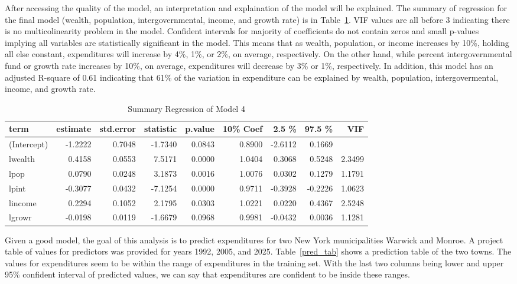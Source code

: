 \documentclass[11pt]{article}\usepackage[]{graphicx}\usepackage[]{color}
\begin{document}
\noindent After accessing the quality of the model, an interpretation and explaination of the model will be explained. The summary of regression for the final model (wealth, population, intergovernmental, income, and growth rate) is in Table~\ref{reg_summary_final}. VIF values are all before 3 indicating there is no multicolinearity problem in the model. Confident intervals for majority of coefficients do not contain zeros and small p-values implying all variables are statistically significant in the model. This means that as wealth, population, or income increases by 10\%, holding all else constant, expenditures will increase by 4\%, 1\%, or 2\%, on average, respectively. On the other hand, while percent intergovernmental fund or growth rate increases by 10\%, on average, expenditures will decrease by 3\% or 1\%, respectively. In addition, this model has an adjusted R-square of 0.61 indicating that 61\% of the variation in expenditure can be explained by wealth, population, intergovermental, income, and growth rate.   

\begin{center}
\begin{table}[ht]
\centering
\begin{tabular}{lrrrrrrrr}
  \hline
term & estimate & std.error & statistic & p.value & 10\% Coef & 2.5 \% & 97.5 \% & VIF \\ 
  \hline
(Intercept) & -1.2222 & 0.7048 & -1.7340 & 0.0843 & 0.8900 & -2.6112 & 0.1669 &  \\ 
  lwealth & 0.4158 & 0.0553 & 7.5171 & 0.0000 & 1.0404 & 0.3068 & 0.5248 & 2.3499 \\ 
  lpop & 0.0790 & 0.0248 & 3.1873 & 0.0016 & 1.0076 & 0.0302 & 0.1279 & 1.1791 \\ 
  lpint & -0.3077 & 0.0432 & -7.1254 & 0.0000 & 0.9711 & -0.3928 & -0.2226 & 1.0623 \\ 
  lincome & 0.2294 & 0.1052 & 2.1795 & 0.0303 & 1.0221 & 0.0220 & 0.4367 & 2.5248 \\ 
  lgrowr & -0.0198 & 0.0119 & -1.6679 & 0.0968 & 0.9981 & -0.0432 & 0.0036 & 1.1281 \\ 
   \hline
\end{tabular}
\caption{Summary Regression of Model 4} 
\label{reg_summary_final}
\end{table}

\end{center}

\noindent Given a good model, the goal of this analysis is to predict expenditures for two New York municipalities Warwick and Monroe. A project table of values for predictors was provided for years 1992, 2005, and 2025. Table~\ref{pred_tab} shows a prediction table of the two towns. The values for expenditures seem to be within the range of expenditures in the training set. With the last two columns being lower and upper 95\% confident interval of predicted values, we can say that expenditures are confident to be inside these ranges.  
\end{document}

